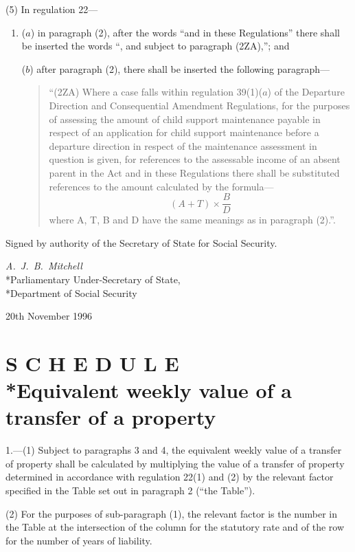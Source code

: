 \documentclass[a4paper]{article}
\newcommand{\parthead}{}
\begin{document}
(5) In regulation 22—
\begin{enumerate}\item[]
($a$) in paragraph (2), after the words “and in these Regulations” there shall be
inserted the words “, and subject to paragraph (2ZA),”; and

($b$) after paragraph (2), there shall be inserted the following paragraph—
\begin{quotation}
“(2ZA) Where a case falls within regulation 39(1)($a$) of the Departure Direction
and Consequential Amendment Regulations, for the purposes of assessing the
amount of child support maintenance payable in respect of an application for
child support maintenance before a departure direction in respect of the
maintenance assessment in question is given, for references to the assessable
income of an absent parent in the Act and in these Regulations there shall be
substituted references to the amount calculated by the formula—
\[(A + T) \times \frac{B}{D}\]
where A, T, B and D have the same meanings as in paragraph (2).”.
\end{quotation}
\end{enumerate}

\bigskip

Signed by authority of the Secretary of State for Social Security.

{\raggedleft
\emph{A.\ J.\ B.\ Mitchell}\\*Parliamentary Under-Secretary of
State,\\*Department of Social Security

}

20th November 1996

\clearpage

\part[Schedule --- Equivalent weekly value of a transfer of a property]{S C H E D U L E\\*Equivalent weekly value of a transfer of a property}

\renewcommand\parthead{--- Schedule}

1.—(1) Subject to
paragraphs 3 and 4, the equivalent weekly value of a transfer of property shall
be calculated by multiplying the value of a transfer of property determined in
accordance with regulation 22(1) and (2) by the relevant factor specified in the
Table set out in paragraph 2 (“the Table”).

(2) For the purposes of sub-paragraph (1), the relevant factor is the number in
the Table at the intersection of the column for the statutory rate and of the
row for the number of years of liability.
\end{document}
